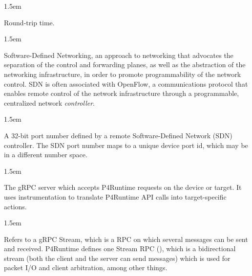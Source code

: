 \documentclass[11pt]{article}
\begin{document}
{\begin{mddefinitions}

\begin{mdbmarginx}{}{}{}{1.5em}%
\begin{mddefdata}%
Round-trip time.
\end{mddefdata}%
\end{mdbmarginx}%


\begin{mdbmarginx}{}{}{}{1.5em}%
\begin{mddefdata}%
Software-Defined Networking, an approach to networking that advocates the
separation of the control and forwarding planes, as well as the abstraction
of the networking infrastructure, in order to promote programmability of the
network control. SDN is often associated with OpenFlow, a communications
protocol that enables remote control of the network infrastructure through a
programmable, centralized network \emph{controller}.
\end{mddefdata}%
\end{mdbmarginx}%


\begin{mdbmarginx}{}{}{}{1.5em}%
\begin{mddefdata}%
A 32-bit port number defined by a remote Software-Defined Network (SDN)
controller. The SDN port number maps to a unique device port id, which may
be in a different number space.
\end{mddefdata}%
\end{mdbmarginx}%


\begin{mdbmarginx}{}{}{}{1.5em}%
\begin{mddefdata}%
The gRPC server which accepts P4Runtime requests on the device or target. It
uses instrumentation to translate P4Runtime API calls into target-specific
actions.
\end{mddefdata}%
\end{mdbmarginx}%


\begin{mdbmarginx}{}{}{}{1.5em}%
\begin{mddefdata}%
Refers to a gRPC Stream, which is a RPC on which several messages can be
sent and received. P4Runtime defines one Stream RPC (), which
is a bidirectional stream (both the client and the server can send messages)
which is used for packet I/O and client arbitration, among other things.
\end{mddefdata}%
\end{mdbmarginx}%


\end{mddefinitions}}
\end{document}
